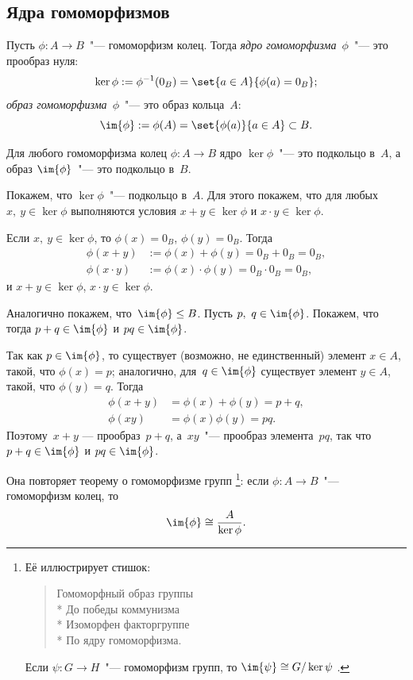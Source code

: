 \subsection{Ядра гомоморфизмов}

Пусть $\phi \colon A \to B$~"--- гомоморфизм колец. Тогда \emph{ядро гомоморфизма~$\phi$}~"--- это прообраз нуля:
\[
	\ker{\phi} := \phi^{-1}(0_B) =
	\set{a \in A}{\phi(a) = 0_B};
\]
\emph{образ гомоморфизма~$\phi$}~"--- это образ кольца~$A$:
\[
	\im{\phi} := \phi(A) = \set{\phi(a)}{a \in A} \subset B
	.
\]

\begin{proposition}
	Для любого гомоморфизма колец $\phi \colon A \to B$ ядро $\ker{\phi}$~"--- это подкольцо в~$A$, а образ $\im{\phi}$~"--- это подкольцо в~$B$.
\end{proposition}
\begin{proofm}
	Покажем, что $\ker{\phi}$~"--- подкольцо в~$A$. Для этого покажем, что для любых $x,\ y \in \ker{\phi}$ выполняются условия $x + y \in \ker{\phi}$ и $x \cdot y \in \ker{\phi}$.
	
	Если $x,\ y \in \ker{\phi}$, то $\phi(x) = 0_B$, $\phi(y) = 0_B$. Тогда
	\begin{align*}
		\phi(x + y) &:=
		\phi(x) + \phi(y)
		=
		0_B + 0_B = 0_B,
		\\
		\phi(x \cdot y) &:=
		\phi(x) \cdot \phi(y)
		=
		0_B \cdot 0_B = 0_B,
	\end{align*}
	и
	$x + y \in \ker{\phi}$,
	$x \cdot y \in \ker{\phi}$.

	\medskip

	Аналогично покажем, что~$\im{\phi} \leq B$. Пусть $p,\ q \in \im{\phi}$. Покажем, что тогда $p+q \in \im{\phi}$ и $pq \in \im{\phi}$.

	Так как $p\in \im{\phi}$, то существует (возможно, не единственный) элемент $x \in A$, такой, что $\phi(x) = p$; аналогично, для~$q \in \im{\phi}$ существует элемент $y \in A$, такой, что $\phi(y) = q$. Тогда
	\begin{align*}
		\phi(x+y) &= \phi(x) + \phi(y) = p + q,
		\\
		\phi(xy) &= \phi(x) \phi(y) = pq
		.
	\end{align*}
	Поэтому~$x + y$ --- прообраз~$p+q$, а~$xy$~"--- прообраз элемента~$pq$, так что $p+q \in \im{\phi}$ и $pq \in \im{\phi}$.
\end{proofm}

\begin{theorem}[о гомоморфизме]
	Она повторяет теорему о гомоморфизме групп%
	\footnote{%
		Её иллюстрирует стишок:
		\begin{verse}
			Гомоморфный образ группы\\*
			До победы коммунизма\\*
			Изоморфен факторгруппе\\*
			По ядру гомоморфизма.
		\end{verse}
		Если $\psi \colon G \to H$~"--- гомоморфизм групп, то
		$
			\im{\psi} \cong
			G/\ker{\psi}
		$%
		.%
	}:
	если $\phi \colon A \to B$~"--- гомоморфизм колец, то
	\[
		\im{\phi} \cong
		\frac{A}{\ker{\phi}}
		.
	\]
\end{theorem}

